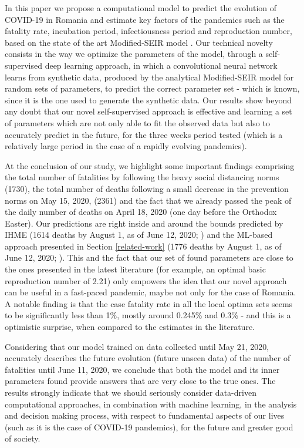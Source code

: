 \documentclass[11pt]{article}
\begin{document}
In this paper we propose a computational model to predict the evolution of COVID-19 in Romania and estimate key factors of the pandemics such as the fatality rate, incubation period, infectiousness period and reproduction number, based on the state of the art Modified-SEIR model \cite{chowdhury2020dynamic}. Our technical novelty consists in the way we optimize the parameters of the model, through a self-supervised deep learning approach, in which a convolutional neural network learns from synthetic data, produced by the analytical Modified-SEIR model for random sets of parameters, to predict the correct parameter set - which is known, since it is the one used to generate the synthetic data. Our results show beyond any doubt that our novel self-supervised approach is effective and learning a set of parameters which are not only able to fit the observed data but also to accurately predict in the future, for the three weeks period tested (which is a relatively large period in the case of a rapidly evolving pandemics). 

At the conclusion of our study, we highlight some important findings comprising the total number of fatalities by following the heavy social distancing norms (1730), the total number of deaths following a small decrease in the prevention norms on May 15, 2020, (2361) and the fact that we already passed the peak of the daily number of deaths on April 18, 2020 (one day before the Orthodox Easter). Our predictions are right inside and around the bounds predicted by IHME (1614 deaths by August 1, as of June 12, 2020; \cite{2020.04.21.20074732}) and the ML-based approach presented in Section \ref{related-work} (1776 deaths by August 1, as of June 12, 2020; \cite{Youyanggu}). This and the fact that our set of found parameters are close to the ones presented in the latest literature (for example, an optimal basic reproduction number of 2.21) only empowers the idea that our novel approach can be useful in a fast-paced pandemic, maybe not only for the case of Romania. A notable finding is that the case fatality rate in all the local optima sets seems to be significantly less than 1\%, mostly around 0.245\% and 0.3\% - and this is a optimistic surprise, when compared to the estimates in the literature.

Considering that our model trained on data collected until May 21, 2020, accurately describes the future evolution (future unseen data) of the number of fatalities until June 11, 2020, we conclude that both the model and its inner parameters found provide answers that are very close to the true ones. The results strongly indicate that we should seriously consider data-driven computational approaches, in combination with machine learning, in 
the analysis and decision making process, with respect to fundamental aspects of our lives (such as it is the case of COVID-19 pandemics), for the future and greater good of society.
\end{document}
